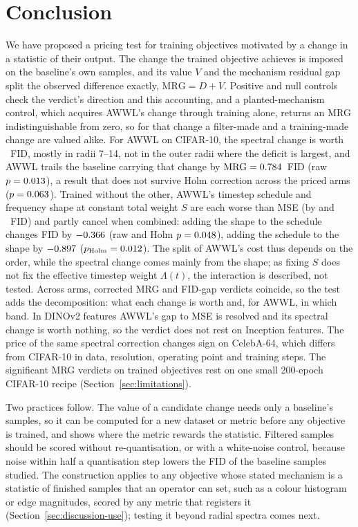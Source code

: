 \section{Conclusion}
\label{sec:conclusion}

We have proposed a pricing test for training objectives motivated by a change
in a statistic of their output. The change the trained objective
achieves is imposed on the baseline's own samples, and its value $V$ and the
mechanism residual gap split the observed difference exactly,
$\mathrm{MRG} = D + V$. Positive and null controls check the verdict's
direction and this accounting, and a planted-mechanism control, which acquires
AWWL's change through training alone, returns an MRG indistinguishable from
zero, so for that change a filter-made and a training-made change are valued
alike. For AWWL on CIFAR-10, the
spectral change is worth \priceTransplantValue~FID, mostly in radii 7--14,
not in the outer radii where the deficit is largest, and AWWL trails
the baseline carrying that change by $\mathrm{MRG} = 0.784$~FID (raw
$p = 0.013$), a result that does not survive Holm correction across the
\nFamilyPricing{} priced arms ($p = 0.063$). Trained without the
other, AWWL's timestep schedule and frequency shape at constant total
weight $S$ are each worse than MSE (by \dTimestep{} and \dSumFixed~FID) and
partly cancel when combined: adding the shape to the schedule changes FID by
$-0.366$ (raw and Holm $p = 0.048$), adding the
schedule to the shape by $-0.897$
($p_{\mathrm{Holm}} = 0.012$). The split of AWWL's cost thus
depends on the order, while the spectral change comes mainly from the shape;
as fixing $S$ does not fix the effective timestep weight $\Lambda(t)$, the
interaction is described, not tested. Across arms, corrected MRG and FID-gap
verdicts coincide, so the test adds the decomposition: what each change is
worth and, for AWWL, in which band. In DINOv2 features AWWL's gap to MSE is
resolved and its spectral change is worth nothing, so the verdict does not
rest on Inception features. The price of the same spectral correction changes sign on CelebA-64,
which differs from CIFAR-10 in data, resolution, operating point and training
steps. The significant MRG verdicts on trained objectives
rest on one small 200-epoch CIFAR-10 recipe (Section~\ref{sec:limitations}).

Two practices follow. The value of a candidate change needs only a baseline's
samples, so it can be computed for a new dataset or metric before any
objective is trained, and shows where the metric rewards the statistic.
Filtered samples should be scored without re-quantisation, or with a
white-noise control, because noise within half a quantisation step lowers
the FID of the baseline samples studied. The construction applies to any
objective whose stated mechanism is a statistic of finished samples that an
operator can set, such as a colour histogram or edge magnitudes, scored by
any metric that registers it (Section~\ref{sec:discussion-use}); testing it
beyond radial spectra comes next.
